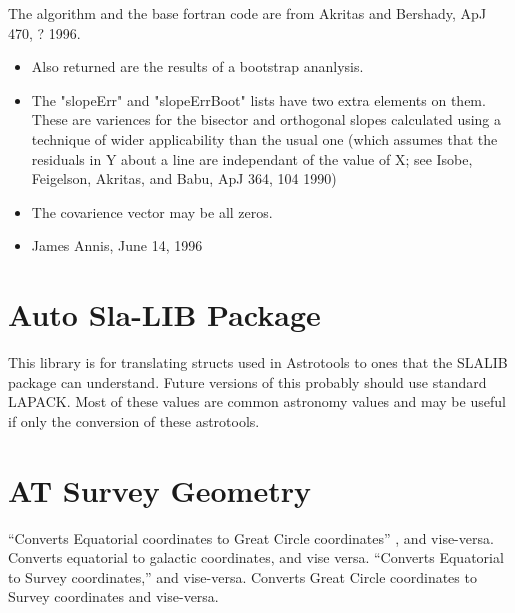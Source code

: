 The algorithm and the base fortran code are from Akritas and Bershady, ApJ 470, ? 1996.
\begin{itemize}
\item Also returned are the results of a bootstrap ananlysis.
\item The "slopeErr" and "slopeErrBoot" lists have two extra elements on them. These are variences for the bisector and orthogonal slopes calculated using a technique of wider applicability than the usual one (which assumes that the residuals in Y about a line are independant of the value of X; see Isobe, Feigelson, Akritas, and Babu, ApJ 364, 104 1990)
\item The covarience vector may be all zeros.
\item James Annis, June 14, 1996 
\end{itemize}


\section {Auto Sla-LIB Package}
This library is for translating structs used in Astrotools to ones that the SLALIB package can understand.  Future versions of this probably should use standard LAPACK.  Most of these values are common astronomy values and may be useful if only the conversion of these astrotools.  

\section {AT Survey Geometry} 
``Converts Equatorial coordinates to Great Circle coordinates'' , and vise-versa.  Converts equatorial to galactic coordinates, and vise versa.   ``Converts Equatorial to Survey coordinates,'' and vise-versa.    Converts Great Circle coordinates to Survey coordinates and vise-versa.

